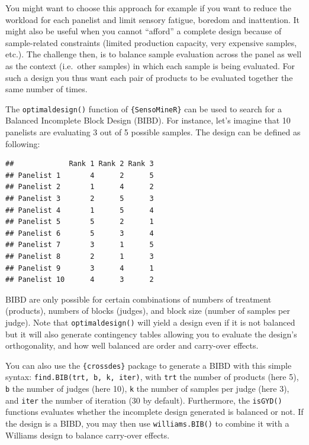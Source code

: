 \documentclass[
]{krantz}
\makeatletter
\newenvironment{Shaded}{\begin{snugshade}}{\end{snugshade}}
\newcommand{\AttributeTok}[1]{\textcolor[rgb]{0.61,0.61,0.61}{#1}}
\newcommand{\DecValTok}[1]{\textcolor[rgb]{0.06,0.06,0.06}{#1}}
\newcommand{\FunctionTok}[1]{\textcolor[rgb]{0,0,0}{#1}}
\newcommand{\NormalTok}[1]{#1}
\newcommand{\OtherTok}[1]{\textcolor[rgb]{0.37,0.37,0.37}{#1}}
\newcommand{\SpecialCharTok}[1]{\textcolor[rgb]{0,0,0}{#1}}
\newenvironment{kframe}{%
\medskip{}
\setlength{\fboxsep}{.8em}
 \def\at@end@of@kframe{}%
 \ifinner\ifhmode%
  \def\at@end@of@kframe{\end{minipage}}%
  \begin{minipage}{\columnwidth}%
 \fi\fi%
 \def\FrameCommand##1{\hskip\@totalleftmargin \hskip-\fboxsep
 \colorbox{shadecolor}{##1}\hskip-\fboxsep
     \hskip-\linewidth \hskip-\@totalleftmargin \hskip\columnwidth}%
 \MakeFramed {\advance\hsize-\width
   \@totalleftmargin\z@ \linewidth\hsize
   \@setminipage}}%
 {\par\unskip\endMakeFramed%
 \at@end@of@kframe}
\renewenvironment{Shaded}{\begin{kframe}}{\end{kframe}}
\makeatother
\begin{document}
You might want to choose this approach for example if you want to reduce the workload for each panelist and limit sensory fatigue, boredom and inattention. It might also be useful when you cannot ``afford'' a complete design because of sample-related constraints (limited production capacity, very expensive samples, etc.). The challenge then, is to balance sample evaluation across the panel as well as the context (i.e.~other samples) in which each sample is being evaluated. For such a design you thus want each pair of products to be evaluated together the same number of times.

The \texttt{optimaldesign()} function of \texttt{\{SensoMineR\}} can be used to search for a Balanced Incomplete Block Design (BIBD). For instance, let's imagine that 10 panelists are evaluating 3 out of 5 possible samples. The design can be defined as following:

\begin{Shaded}
\end{Shaded}

\begin{verbatim}
##             Rank 1 Rank 2 Rank 3
## Panelist 1       4      2      5
## Panelist 2       1      4      2
## Panelist 3       2      5      3
## Panelist 4       1      5      4
## Panelist 5       5      2      1
## Panelist 6       5      3      4
## Panelist 7       3      1      5
## Panelist 8       2      1      3
## Panelist 9       3      4      1
## Panelist 10      4      3      2
\end{verbatim}

BIBD are only possible for certain combinations of numbers of treatment (products), numbers of blocks (judges), and block size (number of samples per judge). Note that \texttt{optimaldesign()} will yield a design even if it is not balanced but it will also generate contingency tables allowing you to evaluate the design's orthogonality, and how well balanced are order and carry-over effects.

You can also use the \texttt{\{crossdes\}} package to generate a BIBD with this simple syntax: \texttt{find.BIB(trt,\ b,\ k,\ iter)}, with \texttt{trt} the number of products (here 5), \texttt{b} the number of judges (here 10), \texttt{k} the number of samples per judge (here 3), and \texttt{iter} the number of iteration (30 by default). Furthermore, the \texttt{isGYD()} functions evaluates whether the incomplete design generated is balanced or not. If the design is a BIBD, you may then use \texttt{williams.BIB()} to combine it with a Williams design to balance carry-over effects.
\end{document}
